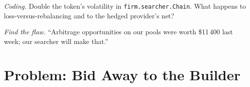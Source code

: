 \begin{exercise}[$\star\star\star$]\label{exo:hf:on-chain-trading:7}
\emph{Coding.} Double the token's volatility in \texttt{firm.searcher.Chain}. What happens to loss-versus-rebalancing and to the hedged provider's net?
\end{exercise}

\begin{exercise}[$\star\star\star$]\label{exo:hf:on-chain-trading:8}
\emph{Find the flaw.} ``Arbitrage opportunities on our pools were worth \$11\,400 last week; our searcher will make that.''
\end{exercise}

\section{Problem: Bid Away to the Builder}

